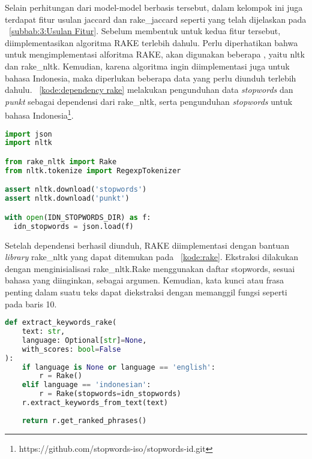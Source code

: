 Selain perhitungan dari model-model berbasis \txt{} \matching{} tersebut, dalam kelompok ini juga terdapat fitur usulan jaccard dan rake\_jaccard seperti yang telah dijelaskan pada \subbab{}~\ref{subbab:3:Usulan Fitur}. Sebelum membentuk \pipeline{} untuk kedua fitur tersebut, diimplementasikan algoritma RAKE terlebih dahulu. Perlu diperhatikan bahwa untuk mengimplementasi alforitma RAKE, akan digunakan beberapa \library{}, yaitu nltk dan rake\_nltk. Kemudian, karena algoritma ingin diimplementasi juga untuk bahasa Indonesia, maka diperlukan beberapa data yang perlu diunduh terlebih dahulu. \kode{}~\ref{kode:dependency rake} melakukan pengunduhan data \textit{stopwords} dan \textit{punkt} sebagai dependensi dari \library{} rake\_nltk, serta pengunduhan \textit{stopwords} untuk bahasa Indonesia\footnote{https://github.com/stopwords-iso/stopwords-id.git}.
\begin{lstlisting}[language=Python, caption={Dependensi algoritma RAKE}, label={kode:dependency rake}]
import json
import nltk

from rake_nltk import Rake
from nltk.tokenize import RegexpTokenizer

assert nltk.download('stopwords')
assert nltk.download('punkt')

with open(IDN_STOPWORDS_DIR) as f:
  idn_stopwords = json.load(f)
\end{lstlisting}

Setelah dependensi berhasil diunduh, RAKE diimplementasi dengan bantuan \textit{library} rake\_nltk yang dapat ditemukan pada \kode{}~\ref{kode:rake}. Ekstraksi dilakukan dengan menginisialisasi rake\_nltk.Rake menggunakan daftar stopwords, sesuai bahasa yang diinginkan, sebagai argumen. Kemudian, kata kunci atau frasa penting dalam suatu teks dapat diekstraksi dengan memanggil fungsi seperti pada baris 10.
\begin{lstlisting}[language=Python, caption={Implementasi RAKE}, label={kode:rake}]
def extract_keywords_rake(
    text: str,
    language: Optional[str]=None,
    with_scores: bool=False
):
    if language is None or language == 'english':
        r = Rake()
    elif language == 'indonesian':
        r = Rake(stopwords=idn_stopwords)
    r.extract_keywords_from_text(text)
    
    return r.get_ranked_phrases()
\end{lstlisting}

